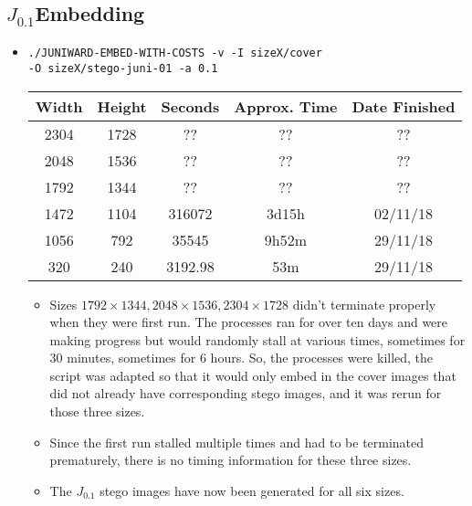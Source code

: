 \documentclass[11pt,a4paper]{report}
\newcommand{\Jtern}{\texorpdfstring{$J_{0.1}$}{J(0.1)}}
\begin{document}
\subsection{\Jtern Embedding}
\begin{itemize}
\item \texttt{./JUNIWARD-EMBED-WITH-COSTS -v -I sizeX/cover} \\
         \texttt{-O sizeX/stego-juni-01 -a 0.1}
  \begin{center}
  \begin{tabular}{ c c | c c c }
  Width & Height & Seconds & Approx. Time & Date Finished \\ \hline
  2304 & 1728 & ?? & ?? & ?? \\
  2048 & 1536 & ?? & ?? & ?? \\
  1792 & 1344 & ?? & ?? & ?? \\
  1472 & 1104 & 316072 & 3d15h & 02/11/18 \\
  1056 & 792 & 35545 & 9h52m & 29/11/18 \\
  320 & 240 & 3192.98 & 53m & 29/11/18 \\
  \end{tabular}
  \end{center}
  \begin{itemize}
  \item Sizes $1792 \times 1344, 2048 \times 1536, 2304 \times 1728$ didn't terminate properly when they were first run. The processes ran for over ten days and were making progress but would randomly stall at various times, sometimes for 30 minutes, sometimes for 6 hours. So, the processes were killed, the script was adapted so that it would only embed in the cover images that did not already have corresponding stego images, and it was rerun for those three sizes.
  \item Since the first run stalled multiple times and had to be terminated prematurely, there is no timing information for these three sizes.
  \item The $J_{0.1}$ stego images have now been generated for all six sizes.
  \end{itemize}
\end{itemize}
\end{document}
